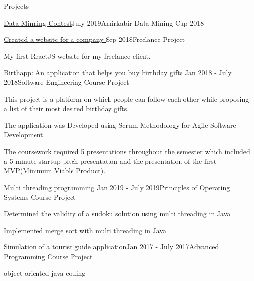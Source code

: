 \documentclass{resume} %
\begin{document}
\begin{rSection}{Projects}
\begin{rSubsection}{\href{https://github.com/mina-parham/data_mining_aut}{\textcolor{coolblack}{Data Minning Contest}}}{July 2019}{Amirkabir Data Mining Cup 2018}{ }
		\end{rSubsection}
		\begin{rSubsection}{\href{https://github.com/mina-parham/Giyoomeh}{\textcolor{coolblack}{Created a website for a company }}}{Sep 2018}{Freelance Project}{ }
		
			\item My first ReactJS website for my freelance client.
			
		\end{rSubsection}	
		  
			\begin{rSubsection}{\href{https://github.com/mina-parham/Birthdate_website}{\textcolor{coolblack}{Birthapp: An application that helps you buy birthday gifts }}}{Jan 2018 - July 2018}{Software Engineering Course Project}{ }
			\item This project is a platform on which people can follow each other while proposing a list of their most desired birthday gifts.
			\item The application was Developed using Scrum Methodology for Agile Software Development.
			\item The coursework required 5 presentations throughout the semester which included a 5-minute startup pitch presentation and the presentation of the first MVP(Minimum Viable Product).
			
		\end{rSubsection}
		
		\begin{rSubsection}{\href{https://github.com/mina-parham/SudokuValidator}{\textcolor{coolblack}{Multi threading programming }}}{Jan 2019 - July 2019}{Principles of Operating Systems Course Project}{ }
			\item Determined the validity of a sudoku solution using multi threading in Java
			\item Implemented merge sort with multi threading in Java
			
		\end{rSubsection}
		
		
		\begin{rSubsection}{Simulation of a tourist guide application}{Jan 2017 - July 2017}{Advanced Programming Course Project}{ }
		    \item object oriented java coding
		\end{rSubsection}
	\end{rSection}
\end{document}
